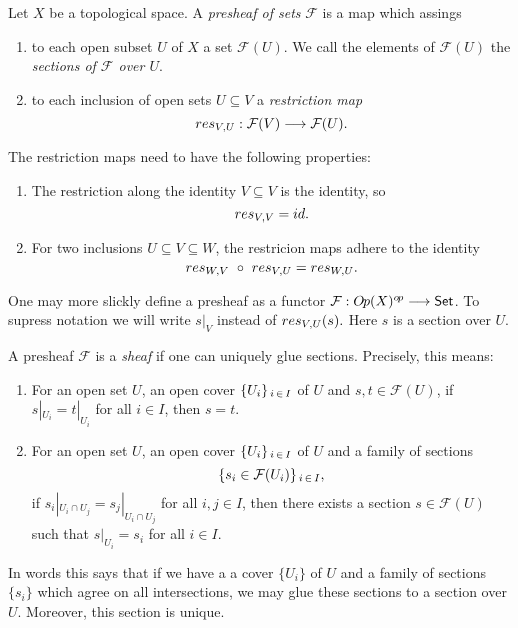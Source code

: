 \begin{definition}[Presheaves] 
  Let $X$ be a topological space. A \textit{presheaf of sets} $\mathcal{F}$  is a map which assings
  \begin{enumerate}
    \item to each open subset $U$ of $X$ a set $\mathcal{F}(U)$. We call the elements of $\mathcal{F}(U)$ the \textit{sections of $\mathcal{F}$ over $U$}.
    \item to each inclusion of open sets $U \subseteq V$ a \textit{restriction map}
    \[res_{V\kern-0.1em , U}: \mathcal{F}(V) \longrightarrow\mathcal{F}(U).\]
  \end{enumerate}
    The restriction maps need to have the following properties: 
    \begin{enumerate}
      \item The restriction along the identity $V \subseteq V$ is the identity, so 
            \[res_{V\kern-0.1em , V} = id.\]
      \item For two inclusions $U \subseteq V \subseteq W$, the restricion maps adhere to the identity 
            \[res_{W\kern-0.1em , V}\ \circ\ res_{V\kern-0.1em , U} = res_{W\kern-0.1em , U}.\]
    \end{enumerate}
  One may more slickly define a presheaf as a functor $\mathcal{F}: O\kern-0.10em p(X)^{o\kern-0.10em p}\longrightarrow \mathsf{Set}$. To supress notation we will write $s|_V$ instead of $res_{V\kern-0.1em , U}(s).$ Here $s$ is a section over $U$.\\
\end{definition}
\begin{definition}[Sheaves]
  A presheaf $\mathcal{F}$ is a \textit{sheaf} if one can uniquely glue sections. Precisely, this means:
  \begin{enumerate}
    \item For an open set $U$, an open cover $\{U_i\}_{\, i\, \in \, I}$ of $U$ and $s, t \in \mathcal{F}(U)$, if $s|_{U_i} = t|_{U_i}$ for all $i \in I$, then $s = t$.
    \item For an open set $U$, an open cover $\{U_i\}_{\, i\, \in \, I}$ of $U$ and a family of sections
    \[\{s_i \in \mathcal{F}(U_i)\}_{\, i\, \in \, I},\]
     if $s_i|_{U_i \cap U_j} = s_j|_{U_i \cap U_j}$ for all $i,j \in I$, then there exists a section $s \in \mathcal{F}(U)$ such that $s|_{U_i} = s_i$ for all $i \in I$.
  \end{enumerate}
  In words this says that if we have a a cover $\{U_i\}$ of $U$ and a family of sections $\{s_i\}$ which agree on all intersections, we may glue these sections to a section over $U$. Moreover, this section is unique.
\end{definition}

